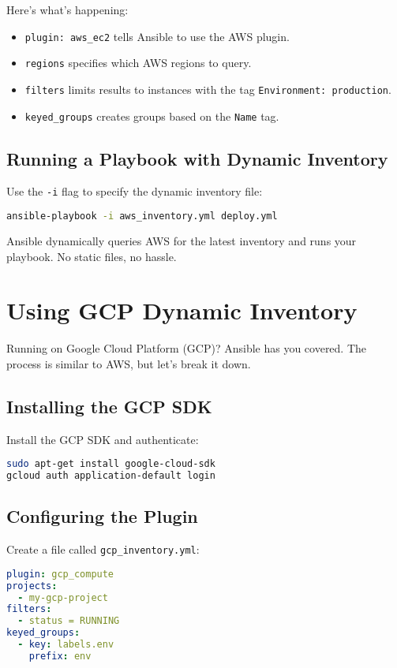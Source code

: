 Here's what's happening:
\begin{itemize}
    \item \texttt{plugin: aws\_ec2} tells Ansible to use the AWS plugin.
    \item \texttt{regions} specifies which AWS regions to query.
    \item \texttt{filters} limits results to instances with the tag \texttt{Environment: production}.
    \item \texttt{keyed\_groups} creates groups based on the \texttt{Name} tag.
\end{itemize}

\subsection{Running a Playbook with Dynamic Inventory}

Use the \texttt{-i} flag to specify the dynamic inventory file:
\begin{lstlisting}[language=bash, caption=Running a Playbook with AWS Dynamic Inventory]
ansible-playbook -i aws_inventory.yml deploy.yml
\end{lstlisting}

Ansible dynamically queries AWS for the latest inventory and runs your playbook. No static files, no hassle.


\section{Using GCP Dynamic Inventory}

Running on Google Cloud Platform (GCP)? Ansible has you covered. The process is similar to AWS, but let's break it down.

\subsection{Installing the GCP SDK}

Install the GCP SDK and authenticate:
\begin{lstlisting}[language=bash, caption=Installing GCP SDK]
sudo apt-get install google-cloud-sdk
gcloud auth application-default login
\end{lstlisting}

\subsection{Configuring the Plugin}

Create a file called \texttt{gcp\_inventory.yml}:
\begin{lstlisting}[language=yaml, caption=GCP Inventory Plugin Configuration]
plugin: gcp_compute
projects:
  - my-gcp-project
filters:
  - status = RUNNING
keyed_groups:
  - key: labels.env
    prefix: env
\end{lstlisting}

